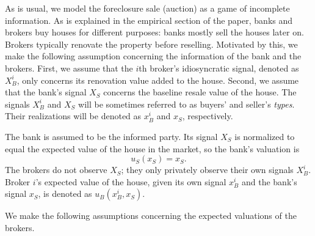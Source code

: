 \documentclass[11pt,twopage]{article}
\begin{document}
As is usual, we model the foreclosure sale (auction) as a game of
incomplete information.  As is explained in the empirical section of
the paper, banks and brokers buy houses for different purposes: banks
mostly sell the houses later on. Brokers typically renovate the
property before reselling. Motivated by this, we make the following
assumption concerning the information of the bank and the
brokers. First, we assume that the $i$th broker's idiosyncratic
signal, denoted as $X_B^i$, only concerns its renovation value added
to the house. Second, we assume that the bank's signal $X_S$ concerns
the baseline resale value of the house. The signals $X_B^i$ and $X_S$
will be sometimes referred to as buyers' and seller's
\emph{types}. Their realizations will be denoted as $x_B^i$ and $x_S$,
respectively.

The bank is assumed to be the informed party. Its signal $X_S$ is
normalized to equal the expected value of the house in the market, so
the bank's valuation is
\[
u_S(x_S) = x_S .
\]
The brokers do not observe $X_S$; they only privately observe their
own signals $X_B^i$. Broker $i$'s expected value of the house, given
its own signal $x_B^i$ and the bank's signal $x_S$, is denoted as $
u_B(x_B^i,x_S).$


%
%



We make the following assumptions concerning the expected valuations
of the brokers.
\end{document}
